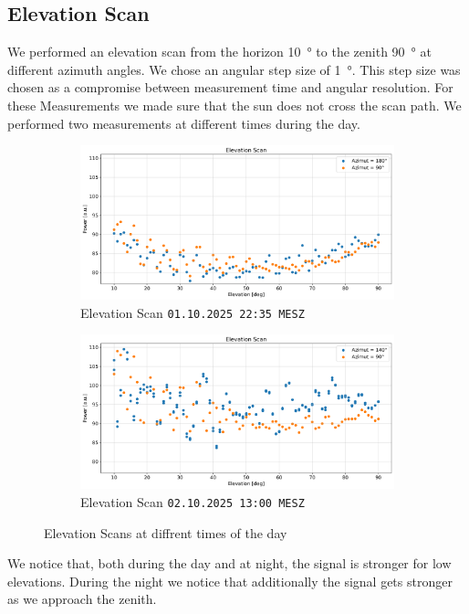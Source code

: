 \subsection{Elevation Scan}
We performed an elevation scan from the horizon \SI{10}{\degree} to the zenith \SI{90}{\degree} at different  azimuth angles. We chose an angular step size of \SI{1}{\degree}. This step size was chosen as a compromise between measurement time and angular resolution. For these Measurements we made sure that the sun does not cross the scan path. We performed two measurements at different times during the day.

\begin{figure}[ht]
\centering
\begin{subfigure}[t]{0.49\textwidth}
    \centering
    \includegraphics[width=0.9\linewidth]{assets/elev_scan_night.png}
    \caption{Elevation Scan \texttt{01.10.2025 22:35 MESZ}}
\end{subfigure}
\begin{subfigure}[t]{0.49\textwidth}
    \centering
    \includegraphics[width=0.9\linewidth]{assets/elev_scan_day.png}
    \caption{Elevation Scan \texttt{02.10.2025 13:00 MESZ}}
\end{subfigure}
\caption{Elevation Scans at diffrent times of the day}
\label{fig:elev_scan}
\end{figure}

We notice that, both during the day and at night, the signal is stronger for low elevations. During the night we notice that additionally the signal gets stronger as we approach the zenith.


